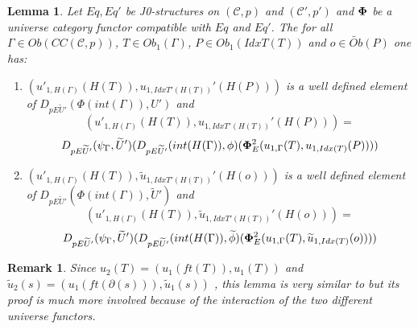 \documentclass[12pt]{article}
\newtheorem{lemma}[proposition]{Lemma}
\newtheorem{remark}[proposition]{Remark}
\newcommand{\llabel}[1]{\label{#1}}
\newcommand{\wt}{\widetilde}
\begin{document}
\begin{lemma}
\llabel{2015.05.06.l3}
Let $Eq, Eq'$ be J0-structures on $({\mathcal C},p)$ and $({\mathcal C}',p')$ and $\bf\Phi$ be a universe category functor compatible with $Eq$ and $Eq'$. The for all $\Gamma\in Ob(CC({\mathcal C},p))$, $T\in Ob_1(\Gamma)$, $P\in Ob_1(IdxT(T))$ and $o\in \wt{Ob}(P)$ one has:
%
\begin{enumerate}
\item $(u'_{1,H(\Gamma)}(H(T)), u_{1,IdxT'(H(T))}'(H(P)))$ is a well defined element of $D_{pE\wt{U}'}(\Phi(int(\Gamma)),U')$ and
%
$$(u'_{1,H(\Gamma)}(H(T)), u_{1,IdxT'(H(T))}'(H(P)))=$$$$D_{pE\wt{U}'}(\psi_{\Gamma},\wt{U}')(D_{pE\wt{U}'}(int(H(\Gamma)),\phi)({\bf\Phi}_{E}^2(u_{1,\Gamma}(T),u_{1,Idx(T)}(P))))$$
%
\item $(u'_{1,H(\Gamma)}(H(T)), \wt{u}_{1,IdxT'(H(T))}'(H(o)))$ is a well defined element of $D_{pE\wt{U}'}(\Phi(int(\Gamma)),\wt{U}')$ and
%
$$(u'_{1,H(\Gamma)}(H(T)), \wt{u}_{1,IdxT'(H(T))}'(H(o)))=$$$$D_{pE\wt{U}'}(\psi_{\Gamma},\wt{U}')(D_{pE\wt{U}'}(int(H(\Gamma)),\wt{\phi})({\bf\Phi}_{E}^2(u_{1,\Gamma}(T),\wt{u}_{1,Idx(T)}(o))))$$
%
\end{enumerate}
\end{lemma}
%
\begin{remark}\rm
Since $u_2(T)=(u_1(ft(T)),u_1(T))$ and $\wt{u}_2(s)=(u_1(ft(\partial(s))),\wt{u}_1(s))$ , this lemma is very similar to \cite[Lemma 6.1(3,4)]{fromunivwithPi} but its proof is much more involved because of the interaction of the two different universe functors. 
\end{remark}
%
\end{document}
